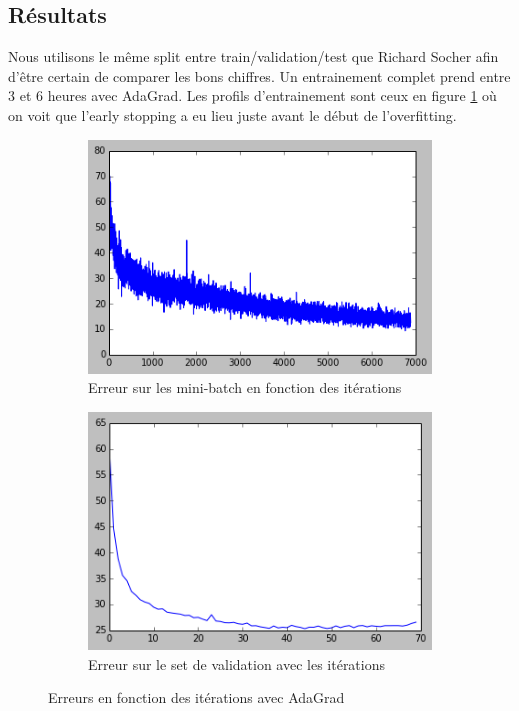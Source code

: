 \documentclass[conference]{IEEEtran}
\begin{document}
\subsection{Résultats}
Nous utilisons le même split entre train/validation/test que Richard Socher afin d'être certain de comparer les bons chiffres. Un entrainement complet prend entre 3 et 6 heures avec AdaGrad. Les profils d'entrainement sont ceux en figure \ref{FinErreur} où on voit que l'early stopping a eu lieu juste avant le début de l'overfitting.

\begin{figure}[h]
\begin{subfigure}{0.48\columnwidth}
\includegraphics[width=\textwidth]{fig/AdaGradLastTrainMbe.png}
\caption{Erreur sur les mini-batch en fonction des itérations}
\end{subfigure}
\begin{subfigure}{0.48\columnwidth}
\includegraphics[width=\textwidth]{fig/AdaGradLastTrainVal.png}
\caption{Erreur sur le set de validation avec les itérations}
\end{subfigure}
\caption{Erreurs en fonction des itérations avec AdaGrad}
\label{FinErreur}
\end{figure}
\end{document}
